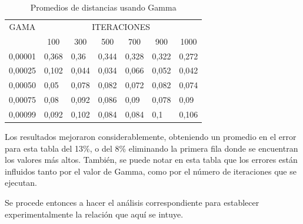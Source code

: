 \begin{table}[H]
\centering
\caption{Promedios de distancias usando Gamma}
\begin{tabular}{cllllll}
GAMA                 & \multicolumn{6}{c}{ITERACIONES}                                                                                                                            \\
\multicolumn{1}{l}{} & \multicolumn{1}{c}{100} & \multicolumn{1}{c}{300} & \multicolumn{1}{c}{500} & \multicolumn{1}{c}{700} & \multicolumn{1}{c}{900} & \multicolumn{1}{c}{1000} \\
0,00001              & 0,368                   & 0,36                    & 0,344                   & 0,328                   & 0,322                   & 0,272                    \\
0,00025              & 0,102                   & 0,044                   & 0,034                   & 0,066                   & 0,052                   & 0,042                    \\
0,00050              & 0,05                    & 0,078                   & 0,082                   & 0,072                   & 0,082                   & 0,074                    \\
0,00075              & 0,08                    & 0,092                   & 0,086                   & 0,09                    & 0,078                   & 0,09                     \\
0,00099              & 0,092                   & 0,102                   & 0,084                   & 0,084                   & 0,1                     & 0,106                   
\end{tabular}
\end{table}
\label{experimento1}

Los resultados mejoraron considerablemente, obteniendo un promedio en el error para esta tabla del 13\%, o del 8\% eliminando la primera fila donde se encuentran los valores más altos. También, se puede notar en esta tabla que los errores están influidos tanto por el valor de Gamma, como por el número de iteraciones que se ejecutan.

Se procede entonces a hacer el análisis correspondiente para establecer experimentalmente la relación que aquí se intuye.

